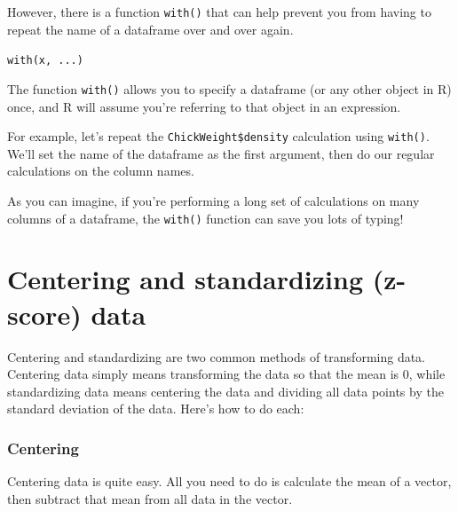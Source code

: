 \documentclass{tufte-book}\usepackage[]{graphicx}\usepackage[]{color}
\makeatletter
\newcommand{\hlopt}[1]{\textcolor[rgb]{0,0,0}{#1}}%
\newcommand{\hlstd}[1]{\textcolor[rgb]{0.345,0.345,0.345}{#1}}%
\newcommand{\hlkwb}[1]{\textcolor[rgb]{0.69,0.353,0.396}{#1}}%
\newcommand{\hlkwd}[1]{\textcolor[rgb]{0.737,0.353,0.396}{\textbf{#1}}}%
\newenvironment{kframe}{%
 \def\at@end@of@kframe{}%
 \ifinner\ifhmode%
  \def\at@end@of@kframe{\end{minipage}}%
  \begin{minipage}{\columnwidth}%
 \fi\fi%
 \def\FrameCommand##1{\hskip\@totalleftmargin \hskip-\fboxsep
 \colorbox{shadecolor}{##1}\hskip-\fboxsep
     \hskip-\linewidth \hskip-\@totalleftmargin \hskip\columnwidth}%
 \MakeFramed {\advance\hsize-\width
   \@totalleftmargin\z@ \linewidth\hsize
   \@setminipage}}%
 {\par\unskip\endMakeFramed%
 \at@end@of@kframe}
\newenvironment{knitrout}{}{} %
\newcommand{\newfun}[1]{\begin{LARGE} \begin{center} \texttt{#1} \end{center} \end{LARGE}}
\makeatother
\begin{document}
\begin{footnotesize}
However, there is a function \texttt{with()} that can help prevent you from having to repeat the name of a dataframe over and over again.

\newfun{with(x, ...)}


The function \texttt{with()} allows you to specify a dataframe (or any other object in R) once, and R will assume you're referring to that object in an expression.

For example, let's repeat the \texttt{ChickWeight\$density} calculation using \texttt{with()}. We'll set the name of the dataframe as the first argument, then do our regular calculations on the column names.


As you can imagine, if you're performing a long set of calculations on many columns of a dataframe, the \texttt{with()} function can save you lots of typing!


\section{Centering and standardizing (z-score) data}

Centering and standardizing are two common methods of transforming data. Centering data simply means transforming the data so that the mean is 0, while standardizing data means centering the data and dividing all data points by the standard deviation of the data. Here's how to do each:

\subsubsection{Centering}

Centering data is quite easy. All you need to do is calculate the mean of a vector, then subtract that mean from all data in the vector.


\end{footnotesize}
\end{document}
